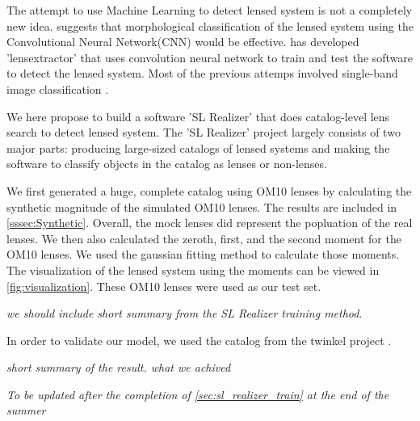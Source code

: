 \documentclass[\docopts]{\docclass}
\begin{document}
The attempt to use Machine Learning to detect lensed system is not a completely new idea. \citep{convolution_neural_network} suggests that morphological classification of the lensed system using the Convolutional Neural Network(CNN) would be effective. \citep{LensExtractor} has developed 'lensextractor' that uses convolution neural network to train and test the software to detect the lensed system. Most of the previous attemps involved single-band image classification \cite{LensExtractor} \cite{convolution_neural_network}.

We here propose to build a software 'SL Realizer' that does catalog-level lens search to detect lensed system. The 'SL Realizer' project largely consists of two major parts: producing large-sized catalogs of lensed systems and making the software to classify objects in the catalog as lenses or non-lenses. 

We first generated a huge, complete catalog using OM10 lenses \citep{OM10} by calculating the synthetic magnitude of the simulated OM10 lenses. The results are included in \ref{sssec:Synthetic}. Overall, the mock lenses did represent the popluation of the real lenses. We then also calculated the zeroth, first, and the second moment for the OM10 lenses. We used the gaussian fitting method to calculate those moments. The visualization of the lensed system using the moments can be viewed in \ref{fig:visualization}. These OM10 lenses were used as our test set.

\textit{we should include short summary from the SL Realizer training method}.

In order to validate our model, we used the catalog from the twinkel project \cite{Twinkles}.

\textit{short summary of the result. what we achived}
 
\textit{To be updated after the completion of \ref{sec:sl_realizer_train} at the end of the summer}



\end{document}
